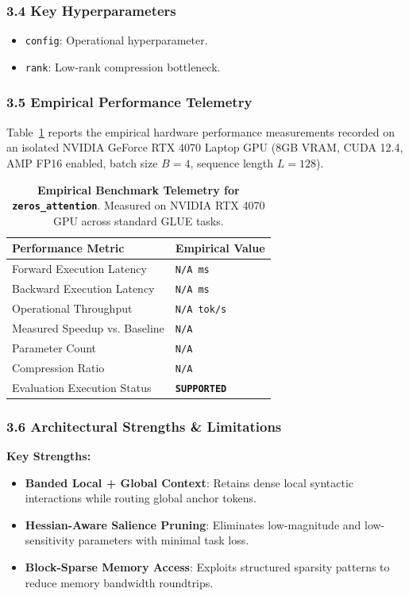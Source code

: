 \subsubsection*{3.4 Key Hyperparameters}
\begin{itemize}
    \item \texttt{config}: Operational hyperparameter.
    \item \texttt{rank}: Low-rank compression bottleneck.
\end{itemize}

\subsubsection*{3.5 Empirical Performance Telemetry}
Table~\ref{tab:telemetry_zeros_attention} reports the empirical hardware performance measurements recorded on an isolated NVIDIA GeForce RTX 4070 Laptop GPU (8GB VRAM, CUDA 12.4, AMP FP16 enabled, batch size $B=4$, sequence length $L=128$).

\begin{table}[h]
\centering
\small
\caption{\textbf{Empirical Benchmark Telemetry for \texttt{zeros\_attention}}. Measured on NVIDIA RTX 4070 GPU across standard GLUE tasks.}
\label{tab:telemetry_zeros_attention}
\begin{tabularx}{\columnwidth}{lX}
\toprule
\textbf{Performance Metric} & \textbf{Empirical Value} \\
\midrule
Forward Execution Latency & \texttt{N/A ms} \\
Backward Execution Latency & \texttt{N/A ms} \\
Operational Throughput & \texttt{N/A tok/s} \\
Measured Speedup vs. Baseline & \texttt{N/A} \\
Parameter Count & \texttt{N/A} \\
Compression Ratio & \texttt{N/A} \\
Evaluation Execution Status & \textbf{\texttt{SUPPORTED}} \\
\bottomrule
\end{tabularx}
\end{table}

\subsubsection*{3.6 Architectural Strengths \& Limitations}
\textbf{Key Strengths:}
\begin{itemize}
    \item \textbf{Banded Local + Global Context}: Retains dense local syntactic interactions while routing global anchor tokens.
    \item \textbf{Hessian-Aware Salience Pruning}: Eliminates low-magnitude and low-sensitivity parameters with minimal task loss.
    \item \textbf{Block-Sparse Memory Access}: Exploits structured sparsity patterns to reduce memory bandwidth roundtrips.
\end{itemize}

